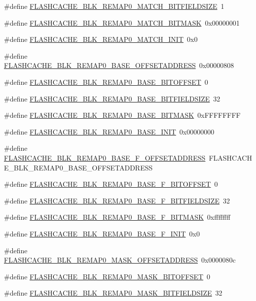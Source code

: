 \begin{DoxyCompactItemize}
\#define \hyperlink{a00550_a93feb9e270db8e7e16a4ecd794e52739}{FLASHCACHE\_\-BLK\_\-REMAP0\_\-MATCH\_\-BITFIELDSIZE}~1
\item 
\#define \hyperlink{a00550_a6c64d31c5c2cfe662de74ce8848ef108}{FLASHCACHE\_\-BLK\_\-REMAP0\_\-MATCH\_\-BITMASK}~0x00000001
\item 
\#define \hyperlink{a00550_a9f235ad554ec57615d771e59749d0a5f}{FLASHCACHE\_\-BLK\_\-REMAP0\_\-MATCH\_\-INIT}~0x0
\item 
\#define \hyperlink{a00550_a5f13209465b68ab69b13f1fdb46ed8e3}{FLASHCACHE\_\-BLK\_\-REMAP0\_\-BASE\_\-OFFSETADDRESS}~0x00000808
\item 
\#define \hyperlink{a00550_a9128c2ad19320a64d030d43dd38c4e5c}{FLASHCACHE\_\-BLK\_\-REMAP0\_\-BASE\_\-BITOFFSET}~0
\item 
\#define \hyperlink{a00550_aa72b541859591786e7200fea7e0534ed}{FLASHCACHE\_\-BLK\_\-REMAP0\_\-BASE\_\-BITFIELDSIZE}~32
\item 
\#define \hyperlink{a00550_a6e926cfc49d787a717d41208267c9887}{FLASHCACHE\_\-BLK\_\-REMAP0\_\-BASE\_\-BITMASK}~0xFFFFFFFF
\item 
\#define \hyperlink{a00550_a1aa11d666be9806b714fb338172d5026}{FLASHCACHE\_\-BLK\_\-REMAP0\_\-BASE\_\-INIT}~0x00000000
\item 
\#define \hyperlink{a00550_a7ae59438b6dc48c1449f06b3963241b9}{FLASHCACHE\_\-BLK\_\-REMAP0\_\-BASE\_\-F\_\-OFFSETADDRESS}~FLASHCACHE\_\-BLK\_\-REMAP0\_\-BASE\_\-OFFSETADDRESS
\item 
\#define \hyperlink{a00550_a83ea13f359115e03744c9387aefa6687}{FLASHCACHE\_\-BLK\_\-REMAP0\_\-BASE\_\-F\_\-BITOFFSET}~0
\item 
\#define \hyperlink{a00550_a9f5040f266f0d694d2d1dffcef077b64}{FLASHCACHE\_\-BLK\_\-REMAP0\_\-BASE\_\-F\_\-BITFIELDSIZE}~32
\item 
\#define \hyperlink{a00550_a911798b7e3200cf7c914e62ad0d8fafe}{FLASHCACHE\_\-BLK\_\-REMAP0\_\-BASE\_\-F\_\-BITMASK}~0xffffffff
\item 
\#define \hyperlink{a00550_ab572ca84f4b06cdf1753bed51808ef84}{FLASHCACHE\_\-BLK\_\-REMAP0\_\-BASE\_\-F\_\-INIT}~0x0
\item 
\#define \hyperlink{a00550_a857d1dce5b00b6c8c10b328a59ab2170}{FLASHCACHE\_\-BLK\_\-REMAP0\_\-MASK\_\-OFFSETADDRESS}~0x0000080c
\item 
\#define \hyperlink{a00550_a637f42223a4a608eae9d189ede03bdf8}{FLASHCACHE\_\-BLK\_\-REMAP0\_\-MASK\_\-BITOFFSET}~0
\item 
\#define \hyperlink{a00550_ace0900eb6a2442db17c512dda425ccb0}{FLASHCACHE\_\-BLK\_\-REMAP0\_\-MASK\_\-BITFIELDSIZE}~32

\end{DoxyCompactItemize}
